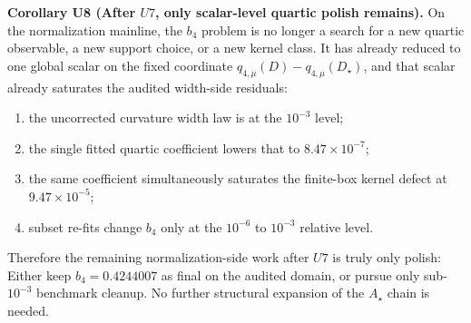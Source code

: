 \documentclass[aps,prd,onecolumn,notitlepage,nofootinbib,superscriptaddress,11pt,floatfix]{revtex4-2}
\begin{document}
\medskip\noindent\textbf{Corollary U8 (After \texorpdfstring{$U7$}{U7}, only scalar-level quartic polish remains).}
On the normalization mainline, the \(b_4\) problem is no longer a search for a new quartic observable, a new support choice, or a new kernel class.  It has already reduced to one global scalar on the fixed coordinate \(q_{4,\mu}(D)-q_{4,\mu}(D_\star)\), and that scalar already saturates the audited width-side residuals:
\begin{enumerate}
\item the uncorrected curvature width law is at the \(10^{-3}\) level;
\item the single fitted quartic coefficient lowers that to \(8.47\times10^{-7}\);
\item the same coefficient simultaneously saturates the finite-box kernel defect at \(9.47\times10^{-5}\);
\item subset re-fits change \(b_4\) only at the \(10^{-6}\) to \(10^{-3}\) relative level.
\end{enumerate}
Therefore the remaining normalization-side work after \(U7\) is truly only polish:
Either keep \(b_4=0.4244007\) as final on the audited domain, or pursue only sub-\(10^{-3}\) benchmark cleanup.
No further structural expansion of the \(A_\star\) chain is needed.
\end{document}
